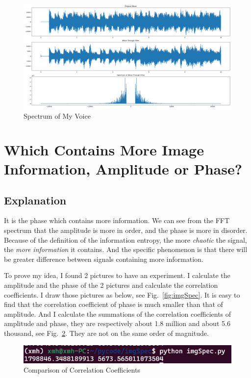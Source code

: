 \documentclass{article}
\begin{document}
\begin{figure}[!h]
	\centering
	\includegraphics[width=6 in]{../pic/voiceSpectrum.png}
	\caption{Spectrum of My Voice}
	\label{fig:voiceSpectrum}
\end{figure}

\section{Which Contains More Image Information, Amplitude or Phase?}
\subsection{Explanation}
It is the phase which contains more information. We can see from the FFT spectrum that the amplitude is more in order, and the phase is more in disorder. Because of the definition of the information entropy, the more \emph{chaotic} the signal, the \emph{more information} it contains. And the specific phenomenon is that there will be greater difference between signals containing more information.



To prove my idea, I found 2 pictures to have an experiment. I calculate the amplitude and the phase of the 2 pictures and calculate the correlation coefficients. I draw those pictures as below, see Fig.~\ref{fig:imgSpec}. It is easy to find that the correlation coefficient of phase is much smaller than that of amplitude. And I calculate the summations of the correlation coefficients of amplitude and phase, they are respectively about 1.8 million and about 5.6 thousand, see Fig.~\ref{fig:corrcoef}. They are not on the same order of magnitude.

\begin{figure}[!h]
	\centering
	\includegraphics[width=3 in]{../pic/corrcoef.png}
	\caption{Comparison of Correlation Coefficients}
	\label{fig:corrcoef}
\end{figure}
\end{document}
